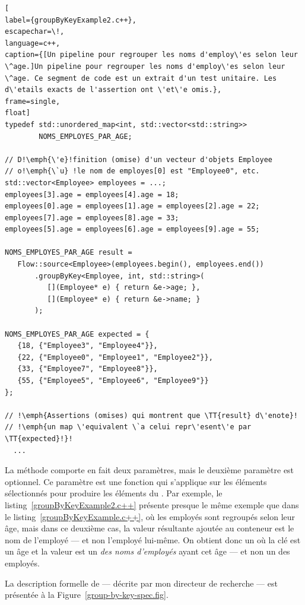 \begin{lstlisting}[
label={groupByKeyExample2.c++},
escapechar=\!,
language=c++,
caption={[Un pipeline pour regrouper les noms d'employ\'es selon leur \^age.]Un pipeline pour regrouper les noms d'employ\'es selon leur \^age. Ce segment de code est un extrait d'un test unitaire. Les d\'etails exacts de l'assertion ont \'et\'e omis.},
frame=single,
float]
typedef std::unordered_map<int, std::vector<std::string>> 
        NOMS_EMPLOYES_PAR_AGE;

// D!\emph{\'e}!finition (omise) d'un vecteur d'objets Employee 
// o!\emph{\`u} !le nom de employes[0] est "Employee0", etc.
std::vector<Employee> employees = ...; 
employees[3].age = employees[4].age = 18;
employees[0].age = employees[1].age = employees[2].age = 22;
employees[7].age = employees[8].age = 33;
employees[5].age = employees[6].age = employees[9].age = 55;

NOMS_EMPLOYES_PAR_AGE result = 
   Flow::source<Employee>(employees.begin(), employees.end())
       .groupByKey<Employee, int, std::string>(
          [](Employee* e) { return &e->age; },
          [](Employee* e) { return &e->name; }
       );
    
NOMS_EMPLOYES_PAR_AGE expected = {
   {18, {"Employee3", "Employee4"}},
   {22, {"Employee0", "Employee1", "Employee2"}},
   {33, {"Employee7", "Employee8"}},
   {55, {"Employee5", "Employee6", "Employee9"}}
};

// !\emph{Assertions (omises) qui montrent que \TT{result} d\'enote}!
// !\emph{un map \'equivalent \`a celui repr\'esent\'e par \TT{expected}!}!
  ...
\end{lstlisting}


La m\'ethode  comporte en fait deux param\`etres, mais le deuxi\`eme param\`etre est optionnel. Ce param\`etre est une fonction qui s'applique sur les \'el\'ements s\'electionn\'es pour produire les \'el\'ements du . Par exemple,  le listing~\ref{groupByKeyExample2.c++} pr\'esente presque le m\^eme exemple que dans le listing~\ref{groupByKeyExample.c++}, o\`u les employ\'es sont regroup\'es selon leur \^age, mais dans ce deuxi\`eme cas, la valeur r\'esultante ajout\'ee au conteneur est le nom de l'employ\'e --- et non l'employ\'e lui-m\^eme. On obtient donc un  o\`u la cl\'e est un \^age et la valeur est un  \emph{des noms d'employ\'es} ayant cet \^age --- et non un  des employ\'es.


La description formelle de  --- d\'ecrite par mon directeur de recherche --- est pr\'esent\'ee \`a la Figure~\ref{group-by-key-spec.fig}.

